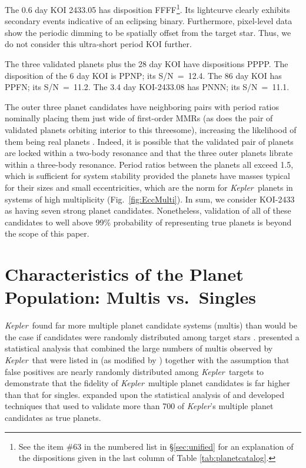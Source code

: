 \documentclass{aastex62}
\newcommand{\ikt}{{\it Kepler}}
\newcommand{\ik}{{\it Kepler~}}
\begin{document}
The 0.6 day KOI 2433.05 has disposition FFFF\footnote{See the item \#63 in the numbered list in \S\ref{sec:unified} for an explanation of the dispositions given in the last column of Table \ref{tab:planetcatalog}.}. Its lightcurve clearly exhibits secondary events indicative of an eclipsing binary. Furthermore, pixel-level data show the periodic dimming to be spatially offset from the target star. Thus, we do not consider this ultra-short period KOI further.

The {three validated planets plus the 28 day} KOI have dispositions PPPP. The disposition of the 6 day KOI is PPNP; its S/N~=~12.4. The 86 day KOI has PPFN; its S/N~=~11.2. The 3.4 day KOI-2433.08 has PNNN; its S/N~=~11.1.

The outer three planet candidates have neighboring pairs with period ratios nominally placing them just wide of first-order MMRs ({as does the pair of validated planets orbiting interior to this threesome}), increasing the likelihood of them being real planets \citep{Lissauer:2014}. Indeed, it is possible that the validated pair of planets are locked within a two-body resonance and that the three outer planets librate within a three-body resonance. Period ratios between the planets all exceed 1.5, which is sufficient for system stability provided the planets have masses typical for their sizes and small eccentricities, which are the norm for \ik planets in systems of high multiplicity (Fig.~\ref{fig:EccMulti}).  In sum, we consider KOI-2433 as having seven strong planet candidates. Nonetheless, validation of all of these candidates to well above 99\% probability of representing true planets is beyond the scope of this paper.

\smallskip

\section{Characteristics of the Planet Population: Multis vs.~Singles} \label{sec:singles}

\ik found far more multiple planet candidate systems (multis) than would be the case if candidates were randomly 
distributed among target stars \citep{Lissauer:2011b, Latham:2011}. \cite{Lissauer:2012} presented a statistical analysis that combined the large numbers of multis observed by \ik that were listed in \citealt{Borucki:2011b} (as modified by \citealt{Lissauer:2011b}) together with the assumption that false positives are nearly randomly distributed among \ik targets to demonstrate that the fidelity of \ik multiple planet candidates is far higher than that for singles.  \cite{Lissauer:2014} expanded upon the statistical analysis of \cite{Lissauer:2012} and developed techniques that \cite{Rowe:2014} used to validate more than 700 of \ikt's multiple planet candidates as true planets. 
\end{document}
